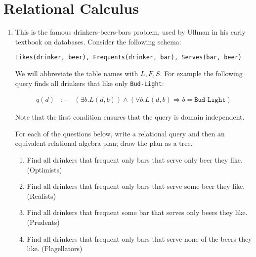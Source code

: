\documentclass[12pt]{article}
\newcounter{query}
\begin{document}
\section{Relational Calculus}


\begin{enumerate}
\item This is the famous drinkers-beers-bars problem, used by Ullman
  in his early textbook on databases.  Consider the following schema:

\begin{verbatim}
Likes(drinker, beer), Frequents(drinker, bar), Serves(bar, beer)
\end{verbatim}

  We will abbreviate the table names with $L, F, S$.  For example the
  following query finds all drinkers that like only
  \texttt{Bud-Light}:

  \begin{eqnarray*}
    q(d) & :- & (\exists b.L(d,b)) \wedge (\forall b.L(d,b) \Rightarrow b=\texttt{Bud-Light})
  \end{eqnarray*}

  Note that the first condition ensures that the query is domain
  independent.

  For each of the questions below, write a relational query and then
  an equivalent relational algebra plan; draw the plan as a tree.

  \begin{enumerate}
  \item Find all drinkers that frequent only bars that serve only beer
    they like.  (Optimists)
  \item Find all drinkers that frequent only bars that serve some beer
    they like.  (Realists)
  \item Find all drinkers that frequent some bar that serves only
    beers they like.  (Prudents)
  \item Find all drinkers that frequent only bars that serve none of
    the beers they like. (Flagellators)
  \end{enumerate}



\end{enumerate}
\end{document}
